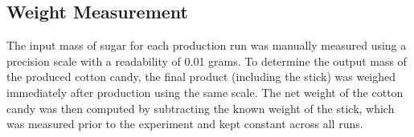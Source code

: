 % 
% 
% 
% 
% 

\subsection{Weight Measurement} 


The input mass of sugar for each production run was manually measured using a precision scale with a readability of 0.01 grams. To determine the output mass of the produced cotton candy, the final product (including the stick) was weighed immediately after production using the same scale. The net weight of the cotton candy was then computed by subtracting the known weight of the stick, which was measured prior to the experiment and kept constant across all runs.


